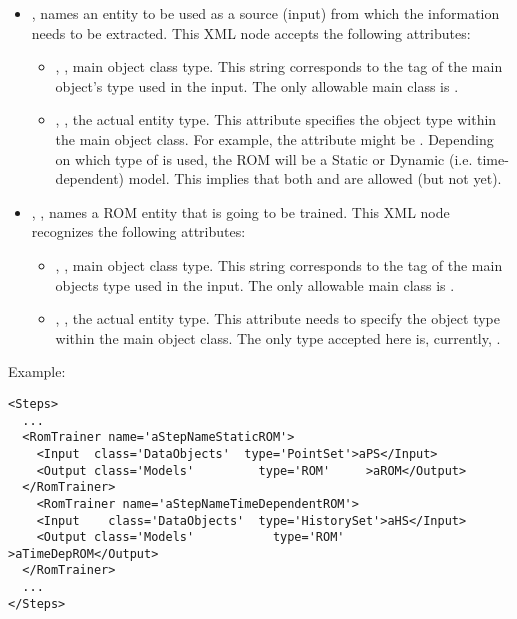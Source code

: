 \begin{itemize}
\item {},  names an entity to
be used as a source (input) from which the information needs to be extracted.
This XML node accepts the following attributes:
  \begin{itemize}
  \item {}, , main object class
    type.
    This string corresponds to the tag of the main object's type used in the
    input.
    The only allowable main class is .
  \item {}, , the actual entity
    type.
    This attribute specifies the object type within the main object class.
    For example, the  attribute might be .
    \nb Depending on which type of  is used, the ROM
    will be a Static or Dynamic (i.e. time-dependent) model. This implies that
    both  and  are allowed (but not
     yet).
  \end{itemize}
\item {}, , names a ROM entity
  that is going to be trained.
  This XML node recognizes the following attributes:
  \begin{itemize}
  \item {}, , main object class
    type.
    This string corresponds to the tag of the main objects type used in the
    input.
    The only allowable main class is .
  \item {}, , the actual entity
    type.
    This attribute needs to specify the object type within the main object
    class.
    The only type accepted here is, currently, .
  \end{itemize}
\end{itemize}

Example:
\begin{lstlisting}[style=XML,morekeywords={class}]
<Steps>
  ...
  <RomTrainer name='aStepNameStaticROM'>
    <Input  class='DataObjects'  type='PointSet'>aPS</Input>
    <Output class='Models'         type='ROM'     >aROM</Output>
  </RomTrainer>
    <RomTrainer name='aStepNameTimeDependentROM'>
    <Input    class='DataObjects'  type='HistorySet'>aHS</Input>
    <Output class='Models'           type='ROM'       >aTimeDepROM</Output>
  </RomTrainer>
  ...
</Steps>
\end{lstlisting}
